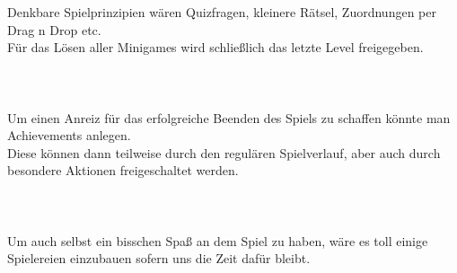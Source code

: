 \documentclass[10pt,a4paper,notitlepage]{report}
\begin{document}
	Denkbare Spielprinzipien wären Quizfragen, kleinere Rätsel, Zuordnungen per Drag n Drop etc.\\
	Für das Lösen aller Minigames wird schließlich das letzte Level freigegeben.\\
	\\
	\
	\\\\
	\Text
		Um einen Anreiz für das erfolgreiche Beenden des Spiels zu schaffen könnte man Achievements anlegen.\\
	Diese können dann teilweise durch den regulären Spielverlauf, aber auch durch besondere Aktionen freigeschaltet werden.\\
	\\
	\\\\
	\Text
		Um auch selbst ein bisschen Spaß an dem Spiel zu haben, wäre es toll einige Spielereien einzubauen sofern uns die Zeit dafür bleibt.\\
	\\
	\\\\\\\\\\\\\\\\\\\\\\\\\\\\\\\\\\\\\\\\\\\\\\\\
	\Fusszeile
\end{document}

